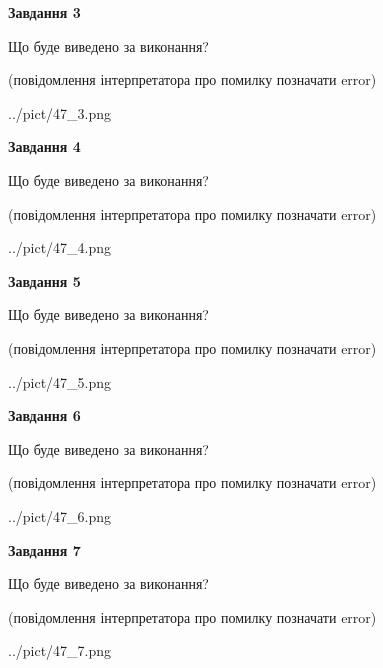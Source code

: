 \documentclass[12pt, ukrainian]{article}
\begin{document}
{\begin {large}
{\begin {center}\textbf{Завдання 3}\end {center}}\par
Що буде виведено за виконання?\par
 (повідомлення інтерпретатора про помилку позначати error)\par
\begin{center}
	{../pict/47_3.png}
\end{center}
\newpage

{\begin {center}\textbf{Завдання 4}\end {center}}\par
Що буде виведено за виконання?\par
 (повідомлення інтерпретатора про помилку позначати error)\par
\begin{center}
	{../pict/47_4.png}
\end{center}
\newpage

{\begin {center}\textbf{Завдання 5}\end {center}}\par
Що буде виведено за виконання?\par
 (повідомлення інтерпретатора про помилку позначати error)\par
\begin{center}
	{../pict/47_5.png}
\end{center}
\newpage

{\begin {center}\textbf{Завдання 6}\end {center}}\par
Що буде виведено за виконання?\par
 (повідомлення інтерпретатора про помилку позначати error)\par
\begin{center}
	{../pict/47_6.png}
\end{center}
\newpage

{\begin {center}\textbf{Завдання 7}\end {center}}\par
Що буде виведено за виконання?\par
 (повідомлення інтерпретатора про помилку позначати error)\par
\begin{center}
	{../pict/47_7.png}
\end{center}
\newpage


\end{large}}
\end{document}

